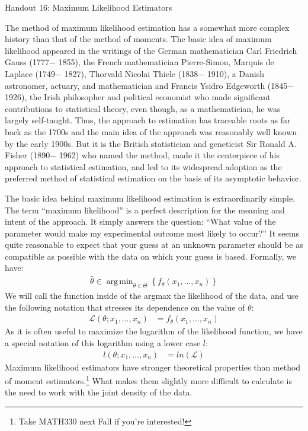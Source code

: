 \documentclass{tufte-handout}
\DeclareMathOperator*{\argmin}{arg\,min}
\begin{document}
\justify

{\LARGE Handout 16: Maximum Likelihood Estimators}

\vspace*{18pt}

\noindent

The method of maximum likelihood estimation has a somewhat more complex
history than that of the method of moments. The basic idea of maximum
likelihood appeared in the writings of the German mathematician Carl
Friedrich Gauss (1777$-$ 1855), the French mathematician Pierre-Simon,
Marquis de Laplace (1749$-$ 1827), Thorvald Nicolai Thiele (1838$-$ 1910), a
Danish astronomer, actuary, and mathematician and Francis Ysidro
Edgeworth (1845$-$ 1926), the Irish philosopher and political economist who
made significant contributions to statistical theory, even though, as a
mathematician, he was largely self-taught. Thus, the approach to
estimation has traceable roots as far back as the 1700s and the main
idea of the approach was reasonably well known by the early 1900s. But
it is the British statistician and geneticist Sir Ronald A. Fisher
(1890$-$ 1962) who named the method, made it the centerpiece of his
approach to statistical estimation, and led to its widespread adoption
as the preferred method of statistical estimation on the basis of its
asymptotic behavior.

The basic idea behind maximum likelihood estimation is extraordinarily
simple. The term ``maximum likelihood'' is
a perfect description for the meaning and intent of the approach. It
simply answers the question: ``What value of the parameter would make my
experimental outcome most likely to occur?'' It seems quite reasonable
to expect that your guess at an unknown parameter should be as
compatible as possible with the data on which your guess is based.
Formally, we have:
\begin{align*}
\widehat{\theta} \in \argmin_{\theta \in \Theta} \left\{ f_\theta(x_1, \ldots, x_n) \right\}
\end{align*}
We will call the function inside of the argmax the likelihood of the
data, and use the following notation that stresses its dependence on
the value of $\theta$:
\begin{align*}
\mathcal{L}(\theta; x_1, \ldots, x_n) &= f_\theta(x_1, \ldots, x_n)
\end{align*}
As it is often useful to maximize the logarithm of the likelihood
function, we have a special notation of this logarithm using a lower
case $l$:
\begin{align*}
l(\theta; x_1, \ldots, x_n) &= ln\left( \mathcal{L} \right)
\end{align*}
Maximum likelihood estimators have stronger theoretical properties than
method of moment estimators.\footnote{Take MATH330 next Fall if you're
interested!} What makes them slightly more difficult to calculate is the
need to work with the joint density of the data.
\end{document}
